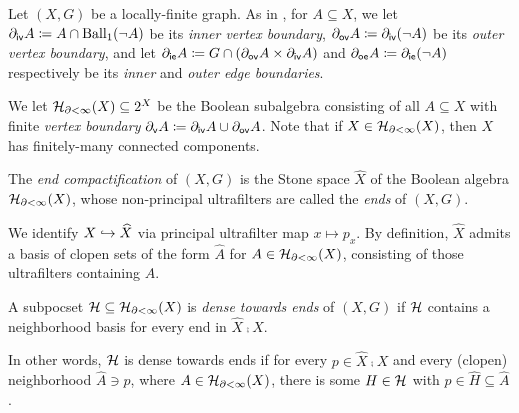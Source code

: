 \documentclass{amsart}
\begin{document}
    Let $(X,G)$ be a locally-finite graph. As in \cite{CPTT23}, for $A\subseteq X$, we let $\partial_{\textsf{iv}}A\coloneqq A\cap\operatorname{Ball}_1(\lnot A)$ be its \textit{inner vertex boundary}, $\partial_{\textsf{ov}}A\coloneqq\partial_{\textsf{iv}}(\lnot A)$ be its \textit{outer vertex boundary}, and let $\partial_{\textsf{ie}}A\coloneqq G\cap(\partial_{\textsf{ov}}A\times\partial_{\textsf{iv}}A)$ and $\partial_{\textsf{oe}}A\coloneqq\partial_{\textsf{ie}}(\lnot A)$ respectively be its \textit{inner} and \textit{outer edge boundaries}.

    We let $\mathcal{H}_{\partial<\infty}(X)\subseteq2^X$ be the Boolean subalgebra consisting of all $A\subseteq X$ with finite \textit{vertex boundary} $\partial_{\textsf{v}}A\coloneqq\partial_{\textsf{iv}}A\cup\partial_{\textsf{ov}}A$. Note that if $X\in\mathcal{H}_{\partial<\infty}(X)$, then $X$ has finitely-many connected components.

    \begin{definition}
        The \textit{end compactification} of $(X,G)$ is the Stone space $\widehat{X}$ of the Boolean algebra $\mathcal{H}_{\partial<\infty}(X)$, whose non-principal ultrafilters are called the \textit{ends} of $(X,G)$.
    \end{definition}

    We identify $X\hookrightarrow\widehat{X}$ via principal ultrafilter map $x\mapsto p_x$. By definition, $\widehat{X}$ admits a basis of clopen sets of the form $\widehat{A}$ for $A\in\mathcal{H}_{\partial<\infty}(X)$, consisting of those ultrafilters containing $A$.

    \begin{definition}
        A subpocset $\mathcal{H}\subseteq\mathcal{H}_{\partial<\infty}(X)$ is \textit{dense towards ends} of $(X,G)$ if $\mathcal{H}$ contains a neighborhood basis for every end in $\widehat{X}\comp X$.
    \end{definition}

    In other words, $\mathcal{H}$ is dense towards ends if for every $p\in\widehat{X}\comp X$ and every (clopen) neighborhood $\widehat{A}\ni p$, where $A\in\mathcal{H}_{\partial<\infty}(X)$, there is some $H\in\mathcal{H}$ with $p\in\widehat{H}\subseteq\widehat{A}$.

    \begin{lemma}\label{lem:coarse_embedding_controls_boundary_diameter}
        
    \end{lemma}
\end{document}
